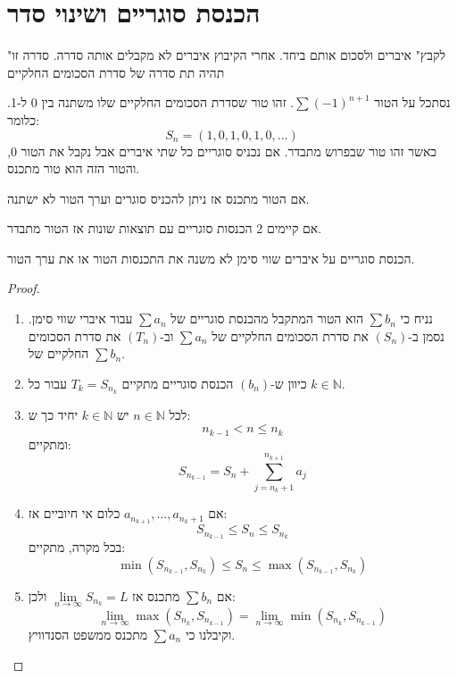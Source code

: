 \documentclass{tstextbook}
\begin{document}
\section{הכנסת סוגריים ושינוי סדר}

\begin{definition}
"לקבץ" איברים ולסכום אותם ביחד. אחרי הקיבוץ איברים לא מקבלים אותה סדרה. סדרה זו תהיה תת סדרה של סדרת הסכומים החלקיים

\end{definition}
\begin{example}
נסתכל על הטור \(\sum(-1)^{n+1}\). זהו טור שסדרת הסכומים החלקיים שלו משתנה בין 0 ל-1. כלומר:
$$S_{n}=\left( 1,0,1,0,1,0,\dots \right)$$
כאשר זהו טור שבפרוש מתבדר. אם נכניס סוגריים כל שתי איברים אבל נקבל את הטור 0, והטור הזה הוא טור מתכנס.

\end{example}
\begin{proposition}
אם הטור מתכנס אז ניתן להכניס סוגרים וערך הטור לא ישתנה.

\end{proposition}
\begin{proposition}
אם קיימים 2 הכנסות סוגריים עם תוצאות שונות אז הטור מתבדר.

\end{proposition}
\begin{proposition}
הכנסת סוגריים על איברים שווי סימן לא משנה את התכנסות הטור או את ערך הטור.

\end{proposition}
\begin{proof}
  \begin{enumerate}
    \item נניח כי \(\sum b_{n}\) הוא הטור המתקבל מהכנסת סוגריים של \(\sum a_{n}\) עבור איברי שווי סימן. נסמן ב-\((S_{n})\) את סדרת הסכומים החלקיים של \(\sum a_{n}\) וב-\((T_{n})\) את סדרת הסכומים החלקיים של \(\sum b_{n}\). 


    \item כיוון ש-\((b_{n})\) הכנסת סוגריים מתקיים \(T_{k}=S_{n_{k}}\) עבור כל \(k \in \mathbb{N}\). 


    \item לכל \(n \in \mathbb{N}\) יש \(k \in \mathbb{N}\) יחיד כך ש: 
$$n_{k-1}<n\leq n_{k}$$ 
ומתקיים:
$$S_{n_{k-1}}= S_{n}+ \sum_{j=n_{k}+1}^{n_{k+1}} a_{j}$$


    \item אם \(a_{n_{k+1}},\dots,a_{n_{k}+1}\) כלום אי חיוביים אז: 
$$S_{n_{k-1}}\leq S_{n}\leq S_{n_{k}}$$
בכל מקרה, מתקיים:
$$\min(S_{n_{k-1}},S_{n_{k}})\leq S_{n}\leq \max (S_{n_{k-1}},S_{n_{k}})$$


    \item אם \(\sum b_{n}\) מתכנס אז \(\underset{ n \to \infty }{\lim }S_{n_{k}}=L\) ולכן: 
$$\lim_{ n \to \infty } \max (S_{n_{k}},S_{n_{k-1}})=\lim_{ n \to \infty } \min(S_{n_{k}},S_{n_{k-1}})$$
וקיבלנו כי \(\sum a_{n}\) מתכנס ממשפט הסנדוויץ.


  \end{enumerate}
\end{proof}
\end{document}
